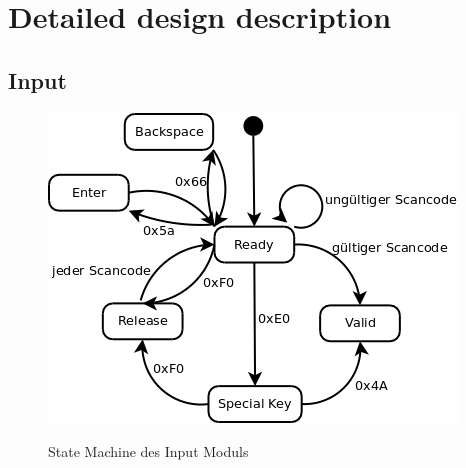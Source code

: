\section{Detailed design description}



\subsection{Input}
\begin{figure}[!ht]
 \caption{State Machine des Input Moduls}
 \centering
 \includegraphics[scale=0.45]{pics/Input.png}
 \label{fig:Modules}
\end{figure}

